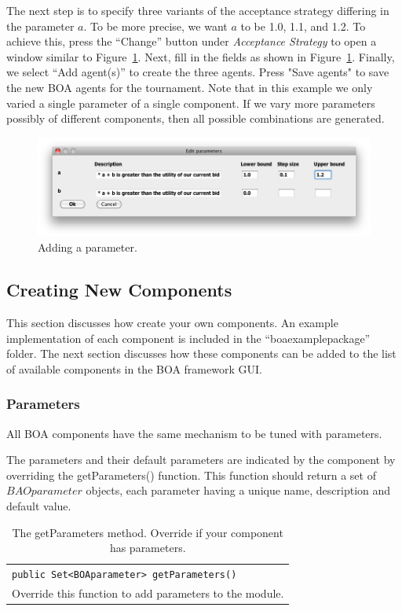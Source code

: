 \documentclass[]{article}
\begin{document}
The next step is to specify three variants of the acceptance strategy differing in the parameter $a$. To be more precise, we want $a$ to be 1.0, 1.1, and 1.2. To achieve this, press the ``Change'' button under  \textit{Acceptance Strategy}  to open a window similar to Figure~\ref{fig:boaparam}. Next, fill in the fields as shown in Figure~\ref{fig:boaparam}. Finally, we select ``Add agent(s)'' to create the three agents. Press "Save agents" to save the new BOA agents for the tournament. Note that in this example we only varied a single parameter of a single component. If we vary more parameters possibly of different components, then all possible combinations are generated.

\begin{figure}[h!] 
	\center
	\includegraphics[width=15cm]{media/BOAparam.png}
	\caption{Adding a parameter.}
	\label{fig:boaparam}
\end{figure}

\subsection{Creating New Components}
This section discusses how create your own components. An example implementation of each component is included in the ``boaexamplepackage'' folder. The next section discusses how these components can be added to the list of available components in the BOA framework GUI.

\subsubsection{Parameters}
All BOA components have the same mechanism to be tuned with parameters. 

The parameters and their default parameters are indicated by the component by overriding the getParameters() function. This function should return a set of $BAOparameter$ objects, each parameter having a unique name, description and default value.


\begin{table}[h]
\begin{tabular}{m{}}
\hline
\texttt{public Set<BOAparameter> getParameters() }\\
 Override this function to add parameters to the module.\\
\hline
\end{tabular}
\caption{The getParameters method. Override if your component has parameters.}
\label{tab:parameters}
\end{table}
\end{document}
